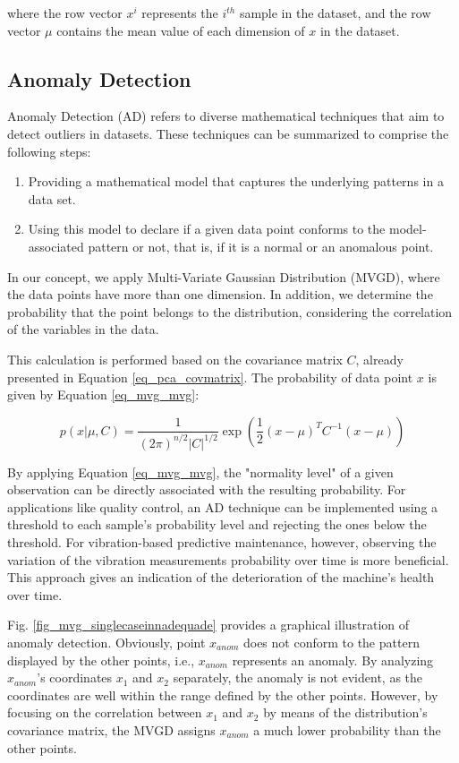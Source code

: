 \documentclass[conference]{IEEEtran}
\begin{document}
where the row vector $x^{i}$ represents the $i^{th}$ sample in the dataset, and the row vector $\mu$ contains the mean value of each dimension of $x$ in the dataset. 

\subsection{Anomaly Detection}
\label{sec_anomaly_detection}
Anomaly Detection (AD) refers to diverse mathematical techniques that aim to detect outliers in datasets. These techniques can be summarized to comprise the following steps: 

\begin{enumerate}
	\item Providing a mathematical model that captures the underlying patterns in a data set.
	\item Using this model to declare if a given data point conforms to the model-associated pattern or not, that is, if it is a normal or an anomalous point.
\end{enumerate}

In our concept, we apply Multi-Variate Gaussian Distribution (MVGD), where the data points have more than one dimension. In addition, we determine the probability that the point belongs to the distribution, considering the correlation of the variables in the data.

This calculation is performed based on the covariance matrix $C$, already presented in Equation \ref{eq_pca_covmatrix}. The probability of data point $x$ is given by Equation \ref{eq_mvg_mvg}:

\begin{equation}
	\label{eq_mvg_mvg}
	p(x|\mu,C)=\frac{1}{(2\pi)^{n/2}|C|^{1/2}}\exp{\left(\frac{1}{2}(x-\mu)^{T}C^{-1}(x-\mu)\right) }
\end{equation}

By applying Equation \ref{eq_mvg_mvg}, the "normality level" of a given observation can be directly associated with the resulting probability. For applications like quality control, an AD technique can be implemented using a threshold to each sample's probability level and rejecting the ones below the threshold. For vibration-based predictive maintenance, however, observing the variation of the vibration measurements probability over time is more beneficial. This approach gives an indication of the deterioration of the machine's health over time.

Fig. \ref{fig_mvg_singlecaseinnadequade} provides a graphical illustration of anomaly detection. Obviously, point $x_{anom}$ does not conform to the pattern displayed by the other points, i.e., $x_{anom}$ represents an anomaly. By analyzing $x_{anom}$'s coordinates $x_{1}$ and $x_{2}$ separately, the anomaly is not evident, as the coordinates are well within the range defined by the other points. However, by focusing on the correlation between $x_{1}$ and $x_{2}$ by means of the distribution's covariance matrix, the MVGD assigns $x_{anom}$ a much lower probability than the other points.
\end{document}
